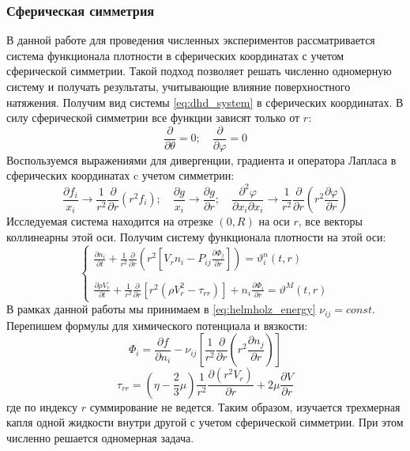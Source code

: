 \subsubsection{Сферическая симметрия}
В данной работе для проведения численных экспериментов рассматривается система функционала плотности в сферических координатах с учетом сферической симметрии. Такой подход позволяет решать численно одномерную систему и получать результаты, учитывающие влияние поверхностного натяжения. Получим вид системы \eqref{eq:dhd_system} в сферических координатах. В силу сферической симметрии все функции зависят только от $r$:
\begin{equation}
\frac{\partial}{\partial \theta} = 0;
\quad
\frac{\partial}{\partial \varphi} = 0 
\end{equation}
Воспользуемся выражениями для дивергенции, градиента и оператора Лапласа в сферических координатах c учетом симметрии:
\begin{equation}
\frac{\partial f_i}{x_i} \rightarrow \frac{1}{r^2} \frac{\partial}{\partial r} ( r^2 f_i );
\quad
\frac{\partial g}{x_i} \rightarrow \frac{\partial g}{\partial r};
\quad
\frac{\partial^2 \varphi}{\partial x_i \partial x_i} \rightarrow \frac{1}{r^2} \frac{\partial}{\partial r} \left( r^2 \frac{\partial \varphi}{\partial r} \right)
\end{equation}
Исследуемая система находится на отрезке $(0, R)$ на оси $r$, все векторы коллинеарны этой оси. Получим систему функционала плотности на этой оси:
\begin{equation} \label{eq:dhd_spherical}
\begin{cases}
\frac{\partial n_{i}}{\partial t} + \frac {1} {r^2} \frac{\partial}{\partial r}\left( r^2 \left[V_{r} n_{i} - P_{i j}\frac{\partial\Phi_{j}}{\partial r} \right] \right)=\vartheta_{i}^{n}(t, r) 
\\ \\
\frac {\partial\rho V_{r}} {\partial t} + \frac {1} {r^2} \frac {\partial} {\partial r} \left[ r^2 \left( \rho V_{r}^2 - \tau_{rr} \right) \right] + n_i \frac{\partial \Phi_i}{\partial r}=\vartheta^{M}(t, r)
\end{cases}
\end{equation}
В рамках данной работы мы принимаем в \eqref{eq:helmholz_energy} $\nu_{ij} = const$. Перепишем формулы для химического потенциала и вязкости:
\begin{equation}
\Phi_i = \frac{\partial f}{\partial n_i} - \nu_{ij} \left[ \frac{1}{r^2} \frac{\partial}{\partial r} \left( r^2 \frac{\partial n_j} {\partial r} \right) \right]
\end{equation}
\begin{equation}
\tau_{rr} = (\eta - \frac{2}{3} \mu) \frac{1}{r^2} \frac{\partial \left( r^2 V_r\right) }{\partial r} + 2\mu \frac{\partial V}{\partial r}
\end{equation}
где по индексу $r$ суммирование не ведется.
Таким образом, изучается трехмерная капля одной жидкости внутри другой с учетом сферической симметрии. При этом численно решается одномерная задача.

